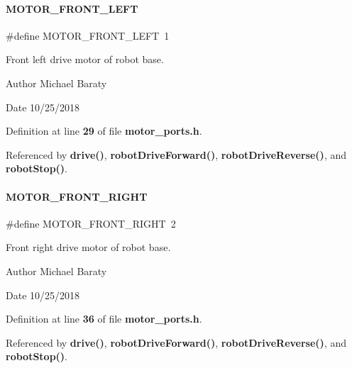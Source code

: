 \paragraph{M\+O\+T\+O\+R\+\_\+\+F\+R\+O\+N\+T\+\_\+\+L\+E\+FT}
{\footnotesize\ttfamily \#define M\+O\+T\+O\+R\+\_\+\+F\+R\+O\+N\+T\+\_\+\+L\+E\+FT~1}



Front left drive motor of robot base. 

\begin{DoxyAuthor}{Author}
Michael Baraty 
\end{DoxyAuthor}
\begin{DoxyDate}{Date}
10/25/2018 
\end{DoxyDate}


Definition at line \textbf{ 29} of file \textbf{ motor\+\_\+ports.\+h}.



Referenced by \textbf{ drive()}, \textbf{ robot\+Drive\+Forward()}, \textbf{ robot\+Drive\+Reverse()}, and \textbf{ robot\+Stop()}.

\mbox{\label{motor__ports_8h_a6f48bcc6d5fce24caeae0b17954c277a}} 
\paragraph{M\+O\+T\+O\+R\+\_\+\+F\+R\+O\+N\+T\+\_\+\+R\+I\+G\+HT}
{\footnotesize\ttfamily \#define M\+O\+T\+O\+R\+\_\+\+F\+R\+O\+N\+T\+\_\+\+R\+I\+G\+HT~2}



Front right drive motor of robot base. 

\begin{DoxyAuthor}{Author}
Michael Baraty 
\end{DoxyAuthor}
\begin{DoxyDate}{Date}
10/25/2018 
\end{DoxyDate}


Definition at line \textbf{ 36} of file \textbf{ motor\+\_\+ports.\+h}.



Referenced by \textbf{ drive()}, \textbf{ robot\+Drive\+Forward()}, \textbf{ robot\+Drive\+Reverse()}, and \textbf{ robot\+Stop()}.

